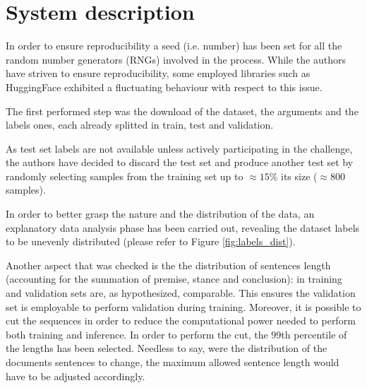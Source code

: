 \documentclass[11pt]{article}
\begin{document}

\section{System description}
\label{sec:system}

In order to ensure reproducibility a seed (i.e. number) has been set for all the random number generators (RNGs) involved in the process. While the authors have striven to ensure reproducibility, some employed libraries such as HuggingFace exhibited a fluctuating behaviour with respect to this issue. 

The first performed step was the download of the dataset, the arguments and the labels ones, each already splitted in train, test and validation.

As test set labels are not available unless actively participating in the challenge, the authors have decided to discard the test set and produce another test set by randomly selecting samples from the training set up to $\approx 15\%$ its size ($\approx 800$ samples).

In order to better grasp the nature and the distribution of the data, an explanatory data analysis phase has been carried out, revealing the dataset labels to be unevenly distributed (please refer to Figure \ref{fig:labels_dist}).

Another aspect that was checked is the the distribution of sentences length (accounting for the summation of premise, stance and conclusion): in training and validation sets are, as hypothesized, comparable. This ensures the validation set is employable to perform validation during training. Moreover, it is possible to cut the sequences in order to reduce the computational power needed to perform both training and inference. In order to perform the cut, the 99th percentile of the lengths has been selected. Needless to say, were the distribution of the documents sentences to change, the maximum allowed sentence length would have to be adjusted accordingly.
\end{document}
